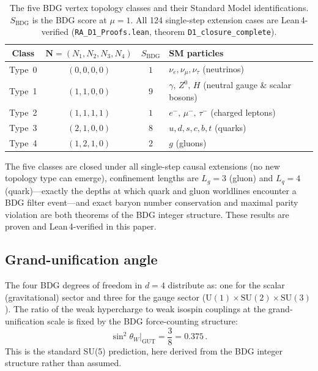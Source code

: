 \documentclass[11pt,twocolumn]{article}
\newcommand{\bdg}{\mathrm{BDG}}
\newcommand{\sinW}{\sin^2\!\theta_W}
\begin{document}
\begin{table}[t]
\centering
\caption{The five BDG vertex topology classes and their Standard Model
  identifications. $S_\bdg$ is the BDG score at $\mu=1$.
  All 124 single-step extension cases are Lean\,4-verified
  (\texttt{RA\_D1\_Proofs.lean}, theorem \texttt{D1\_closure\_complete}).}
\label{tab:particles}
\begin{tabular}{cccp{6cm}}
\hline\hline
Class & $\mathbf{N} = (N_1,N_2,N_3,N_4)$ & $S_\bdg$ & SM particles \\
\hline
Type~0 & $(0,0,0,0)$ & $1$ & $\nu_e,\nu_\mu,\nu_\tau$ (neutrinos) \\
Type~1 & $(1,1,0,0)$ & $9$ & $\gamma,\,Z^0,\,H$ (neutral gauge \& scalar bosons) \\
Type~2 & $(1,1,1,1)$ & $1$ & $e^-,\,\mu^-,\,\tau^-$ (charged leptons) \\
Type~3 & $(2,1,0,0)$ & $8$ & $u,d,s,c,b,t$ (quarks) \\
Type~4 & $(1,2,1,0)$ & $2$ & $g$ (gluons) \\
\hline\hline
\end{tabular}
\end{table}

The five classes are closed under all single-step causal extensions
(no new topology type can emerge), confinement lengths are
$L_g = 3$ (gluon) and $L_q = 4$ (quark)---exactly the depths at
which quark and gluon worldlines encounter a BDG filter event---and
exact baryon number conservation and maximal parity violation are
both theorems of the BDG integer structure.
These results are proven and Lean\,4-verified in this paper.

\subsection{Grand-unification angle}

The four BDG degrees of freedom in $d=4$ distribute as: one for the
scalar (gravitational) sector and three for the gauge sector
($\mathrm{U}(1)\times\mathrm{SU}(2)\times\mathrm{SU}(3)$). The ratio
of the weak hypercharge to weak isospin couplings at the
grand-unification scale is fixed by the BDG force-counting structure:
\begin{equation}
  \sinW\big|_{\mathrm{GUT}} = \frac{3}{8} = 0.375\,.
  \label{eq:sin2W}
\end{equation}
This is the standard SU(5) prediction, here derived from the BDG
integer structure rather than assumed.
\end{document}

